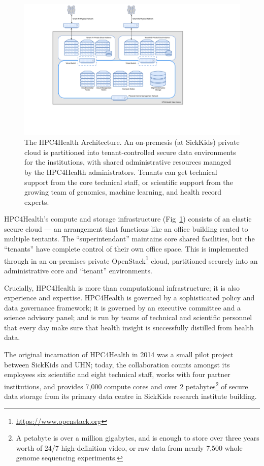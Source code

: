 \documentclass[twoside,symmetric,sfsidenotes,notoc]{tufte-book}
\begin{document}
\begin{figure}
  \includegraphics{HPC4Health_1.pdf}
  \caption[HPC4Health Architecture Diagram]{The HPC4Health Architecture.  An on-premesis (at SickKids) private
  cloud is partitioned into tenant-controlled secure data environments for the institutions, with shared administrative
  resources managed by the HPC4Health administrators.  Tenants can get technical support from the core
  technical staff, or scientific support from the growing team of genomics, machine learning, and
  health record experts. }
  \label{fig:hpc4health-architecture}
\end{figure}

HPC4Health's compute and storage infrastructure (Fig~\ref{fig:hpc4health-architecture})
consists of an elastic secure cloud --- an arrangement that functions like an office building
rented to multiple tentants.  The ``superintendant'' maintains core shared facilities, but
the ``tenants'' have complete control of their own office space.   This is implemented through
in an on-premises private OpenStack\footnote{\url{https://www.openstack.org}} cloud,
partitioned securely into an administrative core and ``tenant'' environments.

Crucially, HPC4Health is more than computational infrastructure;  it is also
experience and expertise.  HPC4Health is governed by a sophisticated
policy and data governance framework; it is governed by an executive committee
and a science advisory panel; and is run by teams of technical and scientific
personnel that every day make sure that health insight is successfully distilled from
health data.

The original incarnation of HPC4Health in 2014 was a small pilot project between
SickKids and UHN; today, the collaboration counts amongst its employees six scientific 
and eight technical staff, works with four partner institutions, and provides 7,000
compute cores and over 2 petabytes\footnote{A petabyte is over a million gigabytes,
and is enough to store over three years worth of 24/7 high-definition video, or 
raw data from nearly 7,500 whole genome sequencing experiments.} of secure data storage
from its primary data centre in SickKids research institute building.
\end{document}
